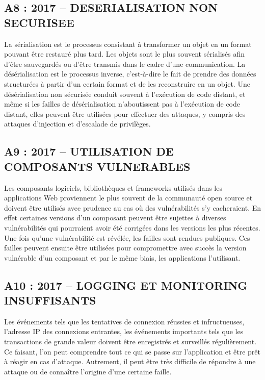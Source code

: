 \subsection*{A8 : 2017 – DESERIALISATION NON SECURISEE}
La sérialisation est le processus consistant à transformer un objet en un format pouvant être restauré plus tard. Les objets sont le plus souvent sérialisés afin d’être sauvegardés ou d’être transmis dans le cadre d’une communication. La désérialisation est le processus inverse, c'est-à-dire le fait de prendre des données structurées à partir d'un certain format et de les reconstruire en un objet. Une désérialisation non sécurisée conduit souvent à l'exécution de code distant, et même si les failles de désérialisation n'aboutissent pas à l'exécution de code distant, elles peuvent être utilisées pour effectuer des attaques, y compris des attaques d'injection et d'escalade de privilèges.
\subsection*{A9 : 2017 – UTILISATION DE COMPOSANTS VULNERABLES}
Les composants logiciels, bibliothèques et frameworks utilisés dans les applications Web proviennent le plus souvent de la communauté open source et doivent être utilisés avec prudence au cas où des vulnérabilités s’y cacheraient. En effet certaines versions d’un composant peuvent être sujettes à diverses vulnérabilités qui pourraient avoir été corrigées dans les versions les plus récentes. Une fois qu'une vulnérabilité est révélée, les failles sont rendues publiques. Ces failles peuvent ensuite être utilisées pour compromettre avec succès la version vulnérable d’un composant et par le même biais, les applications l’utilisant.
\subsection*{A10 : 2017 – LOGGING ET MONITORING INSUFFISANTS}
Les événements tels que les tentatives de connexion réussies et infructueuses, l'adresse IP des connexions entrantes, les événements importants tels que les transactions de grande valeur doivent être enregistrés et surveillés régulièrement. Ce faisant, l’on peut comprendre tout ce qui se passe sur l’application et être prêt à réagir en cas d’attaque. Autrement, il peut être très difficile de répondre à une attaque ou de connaître l’origine d’une certaine faille.
